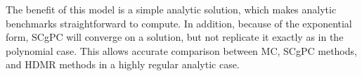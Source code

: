 The benefit of this model is a simple analytic solution, which makes analytic benchmarks straightforward to
compute.  In
addition, because of the exponential form, SCgPC will converge on a solution, but not replicate it exactly as
in the polynomial case.  This allows accurate comparison between MC, SCgPC methods, and HDMR methods in a
highly regular analytic case.

%
